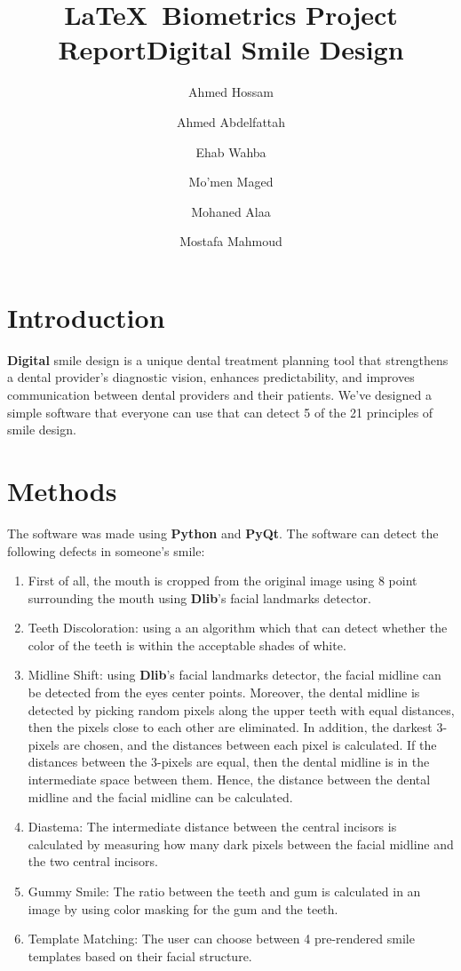\documentclass[conference,twocolumn]{IEEEtran}
\begin{document}
\title{\LaTeX\ Biometrics Project Report}

\title{Digital Smile Design}
\author[1]{Ahmed Hossam}
\author[1]{Ahmed Abdelfattah }
\author[1]{Ehab Wahba }
\author[1]{Mo'men Maged}
\author[1]{Mohaned Alaa }
\author[1]{Mostafa Mahmoud}


\renewcommand\Authands{ and }

\maketitle
\pagestyle{plain}

\section{\textbf{Introduction}}
\textbf{Digital} smile design is a unique dental treatment planning tool that strengthens a dental provider's diagnostic vision, enhances predictability, and improves communication between dental providers and their patients. We've designed a simple software that everyone can use that can detect 5 of the 21 principles of smile design.
\section{\textbf{Methods}}
 The software was made using \textbf{Python} and \textbf{PyQt}. The software can detect the following defects in someone's smile:
\begin{enumerate}
    \item First of all, the mouth is cropped from the original image using 8 point surrounding the mouth using \textbf{Dlib}'s facial landmarks detector.
    \item Teeth Discoloration: using a an algorithm which  that can detect whether the color of the teeth is within the acceptable shades of white.
    \item Midline Shift: using \textbf{Dlib}'s facial landmarks detector, the facial midline can be detected from the eyes center points. Moreover, the dental midline is detected by picking random pixels along the upper teeth with equal distances, then the pixels close to each other are eliminated. In addition, the darkest 3-pixels are chosen, and the distances between each pixel is calculated. If the distances between the 3-pixels are equal, then the dental midline is in the intermediate space between them. Hence, the distance between the dental midline and the facial midline can be calculated.
    \item Diastema: The intermediate distance between the central incisors is calculated by measuring how many dark pixels between the facial midline and the two central incisors.
    \item Gummy Smile: The ratio between the teeth and gum is calculated in an image by using color masking for the gum and the teeth.
    \item Template Matching: The user can choose between 4 pre-rendered smile templates based on their facial structure.
    
\end{enumerate}
\end{document}
